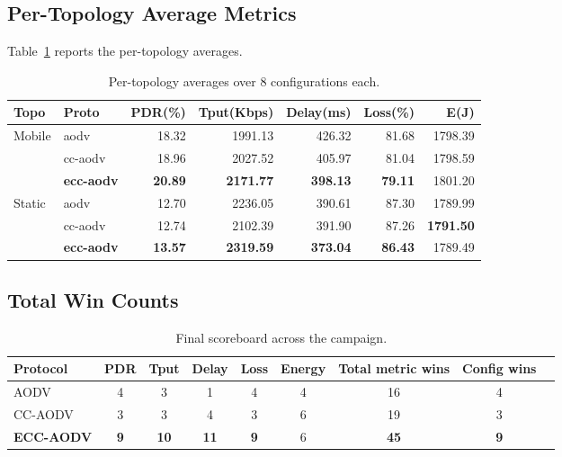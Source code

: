 \documentclass[11pt,a4paper]{article}
\newcommand{\best}[1]{\textbf{#1}}
\begin{document}
\subsection{Per-Topology Average Metrics}

Table~\ref{tab:topo-avg} reports the per-topology averages.

\begin{table}[h]
\centering
\caption{Per-topology averages over $8$ configurations each.}
\label{tab:topo-avg}
\small
\begin{tabular}{l l r r r r r}
\toprule
\textbf{Topo} & \textbf{Proto} & \textbf{PDR(\%)} & \textbf{Tput(Kbps)} & \textbf{Delay(ms)} & \textbf{Loss(\%)} & \textbf{E(J)} \\
\midrule
\multirow{3}{*}{Mobile}
 & aodv     & 18.32 & 1991.13 & 426.32 & 81.68 & 1798.39 \\
 & cc-aodv  & 18.96 & 2027.52 & 405.97 & 81.04 & 1798.59 \\
 & \best{ecc-aodv} & \best{20.89} & \best{2171.77} & \best{398.13} & \best{79.11} & 1801.20 \\
\midrule
\multirow{3}{*}{Static}
 & aodv     & 12.70 & 2236.05 & 390.61 & 87.30 & 1789.99 \\
 & cc-aodv  & 12.74 & 2102.39 & 391.90 & 87.26 & \best{1791.50} \\
 & \best{ecc-aodv} & \best{13.57} & \best{2319.59} & \best{373.04} & \best{86.43} & 1789.49 \\
\bottomrule
\end{tabular}
\end{table}

\subsection{Total Win Counts}

\begin{table}[h]
\centering
\caption{Final scoreboard across the campaign.}
\label{tab:scoreboard}
\small
\begin{tabular}{l c c c c c c c c}
\toprule
\textbf{Protocol} & \textbf{PDR} & \textbf{Tput} & \textbf{Delay} & \textbf{Loss} & \textbf{Energy}
                  & \textbf{Total metric wins} & \textbf{Config wins} \\
\midrule
AODV     & 4 & 3  & 1  & 4 & 4 & 16 & 4 \\
CC-AODV  & 3 & 3  & 4  & 3 & 6 & 19 & 3 \\
\best{ECC-AODV} & \best{9} & \best{10} & \best{11} & \best{9} & 6 & \best{45} & \best{9} \\
\bottomrule
\end{tabular}
\end{table}
\end{document}
